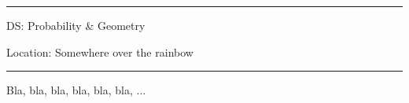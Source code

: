 \documentclass[12pt]{article}
\begin{document}
\setlength{\parindent}{0pt}

\begin{center}
\rule[0.4ex]{\linewidth}{0.2ex}

DS: Probability \& Geometry

Location: Somewhere over the rainbow

\rule[0.4ex]{\linewidth}{0.2ex}
\end{center}

Bla, bla, bla, bla, bla, bla, ...
\end{document}
